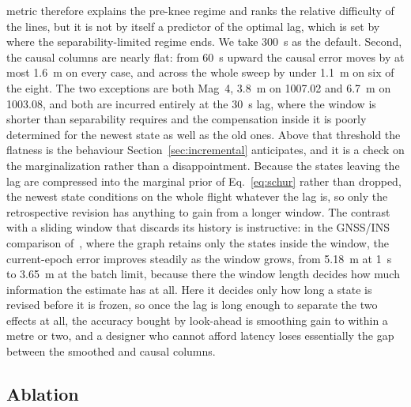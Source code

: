 \documentclass{IEEEtaes}
\begin{document}
metric therefore explains the pre-knee regime and ranks the relative
difficulty of the lines, but it is not by itself a predictor of the optimal
lag, which is set by where the separability-limited regime ends. We take
\SI{300}{\second} as the default. Second, the causal columns are nearly flat:
from \SI{60}{\second} upward the causal error moves by at most
\SI{1.6}{\meter} on every case, and across the whole sweep by under
\SI{1.1}{\meter} on six of the eight. The two exceptions are both Mag~4,
\SI{3.8}{\meter} on 1007.02 and \SI{6.7}{\meter} on 1003.08, and both are
incurred entirely at the \SI{30}{\second} lag, where the window is shorter
than separability requires and the compensation inside it is poorly determined
for the newest state as well as the old ones. Above that threshold the
flatness is the behaviour Section~\ref{sec:incremental} anticipates, and it
is a check on the marginalization rather than a disappointment. Because the
states leaving the lag are compressed into the marginal prior of
Eq.~\eqref{eq:schur} rather than dropped, the newest state conditions on the
whole flight whatever the lag is, so only the retrospective revision has
anything to gain from a longer window. The contrast with a sliding window that
discards its history is instructive: in the GNSS/INS comparison
of~\cite{wen2021}, where the graph retains only the states inside the window,
the current-epoch error improves steadily as the window grows, from
\SI{5.18}{\meter} at \SI{1}{\second} to \SI{3.65}{\meter} at the batch limit,
because there the window length decides how much information the estimate has
at all. Here it decides only how long a state is revised before it is frozen,
so once the lag is long enough to separate the two effects at all, the
accuracy bought by look-ahead is smoothing gain to within a metre or two, and
a designer who cannot afford latency loses essentially the gap between the
smoothed and causal columns.

\subsection{Ablation}\label{sec:ablation}
\end{document}
